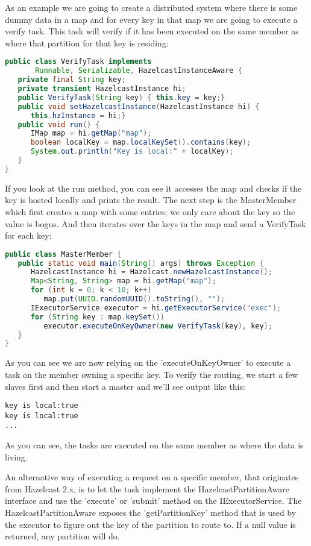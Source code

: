 As an example we are going to create a distributed system where there is some dummy data in a map and for every key in that map we are going to execute a verify task. This task will verify if it has been executed on the same member as where that partition for that key is residing:
\begin{lstlisting}[language=java]
public class VerifyTask implements
       Runnable, Serializable, HazelcastInstanceAware {
   private final String key;
   private transient HazelcastInstance hi;
   public VerifyTask(String key) { this.key = key;}
   public void setHazelcastInstance(HazelcastInstance hi) {
      this.hzInstance = hi;}
   public void run() {
      IMap map = hi.getMap("map");
      boolean localKey = map.localKeySet().contains(key);
      System.out.println("Key is local:" + localKey);
   }
}
\end{lstlisting}
If you look at the run method, you can see it accesses the map and checks if the key is hosted locally and prints the result. The next step is the MasterMember which first creates a map with some entries; we only care about the key so the value is bogus. And then iterates over the keys in the map and send a VerifyTask for each key:
\begin{lstlisting}[language=java]
public class MasterMember {
   public static void main(String[] args) throws Exception {
      HazelcastInstance hi = Hazelcast.newHazelcastInstance();
      Map<String, String> map = hi.getMap("map");
      for (int k = 0; k < 10; k++)
         map.put(UUID.randomUUID().toString(), "");
      IExecutorService executor = hi.getExecutorService("exec");
      for (String key : map.keySet())
         executor.executeOnKeyOwner(new VerifyTask(key), key);
   }
}
\end{lstlisting}
As you can see we are now relying on the 'executeOnKeyOwner' to execute a task on the member owning a specific key. To verify the routing, we start a few slaves first and then start a master and we'll see output like this:
\begin{lstlisting}
key is local:true
key is local:true
...
\end{lstlisting}
As you can see, the tasks are executed on the same member as where the data is living.

An alternative way of executing a request on a specific member, that originates from Hazelcast 2.x, is to let the task implement the HazelcastPartitionAware interface and use the  'execute' or 'submit' method on the IExecutorService. The HazelcastPartitionAware exposes the 'getPartitionKey' method that is used by the executor to figure out the key of the partition to route to. If a null value is returned, any partition will do.

